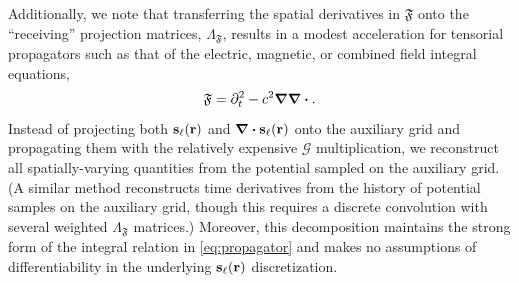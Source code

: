 Additionally, we note that transferring the spatial derivatives in $\mathfrak{F}$ onto the ``receiving'' projection matrices, $\Lambda_\mathfrak{F}$, results in a modest acceleration for tensorial propagators such as that of the electric, magnetic, or combined field integral equations,
\begin{equation}
  \mathfrak{F} = \partial_t^2 -c^2 \grad \grad \boldsymbol{\cdot}.
\end{equation}
Instead of projecting both $\vb{s}_\ell(\vb{r})$ and $\div{\vb{s}_\ell(\vb{r})}$ onto the auxiliary grid and propagating them with the relatively expensive $\mathcal{G}$ multiplication, we reconstruct all spatially-varying quantities from the potential sampled on the auxiliary grid.
(A similar method reconstructs time derivatives from the history of potential samples on the auxiliary grid, though this requires a discrete convolution with several weighted $\Lambda_\mathfrak{F}$ matrices.)
Moreover, this decomposition maintains the strong form of the integral relation in \cref{eq:propagator} and makes no assumptions of differentiability in the underlying $\vb{s}_\ell(\vb{r})$ discretization.

